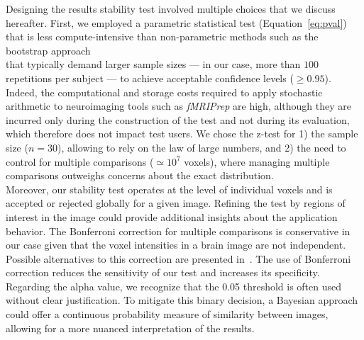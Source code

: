 \documentclass[lettersize,journal]{IEEEtran}
\newcommand{\fmriprep}{\emph{fMRIPrep}\xspace}
\newcommand{\add}[1]{\textcolor{green!60!black}{#1\\}} %
\begin{document}
Designing the results stability test involved multiple choices that we discuss
hereafter. First, we employed a parametric statistical test
(Equation~\ref{eq:pval}) that is less compute-intensive than non-parametric
methods \add{such as the bootstrap approach~\cite{zrimvsek2024quantifying}}
that typically demand larger sample sizes --- in our case, more than $100$
repetitions per subject --- to achieve acceptable confidence levels ($\geq
  0.95$). Indeed, the computational and storage costs required to apply
stochastic arithmetic to neuroimaging tools such as \fmriprep are high,
although they are incurred only during the construction of the test and not
during its evaluation, which therefore does not impact test users. \add{We
  chose the z-test for 1) the sample size ($n = 30$), allowing to rely on the law
  of large numbers, and 2) the need to control for multiple comparisons
  ($\simeq10^7$ voxels), where managing multiple comparisons outweighs concerns
  about the exact distribution.} Moreover, our stability test operates at the
level of individual voxels and is accepted or rejected globally for a given
image. Refining the test by regions of interest in the image could provide
additional insights about the application behavior. The Bonferroni correction
for multiple comparisons is conservative in our case given that the voxel
intensities in a brain image are not independent. Possible alternatives to this
correction are presented in~\cite{NICHOLS2007246}. The use of Bonferroni
correction reduces the sensitivity of our test and increases its specificity.
\add{Regarding the alpha value, we recognize that the 0.05 threshold is often
  used without clear justification. To mitigate this binary decision, a Bayesian
  approach could offer a continuous probability measure of similarity between
  images, allowing for a more nuanced interpretation of the results.}
\end{document}
